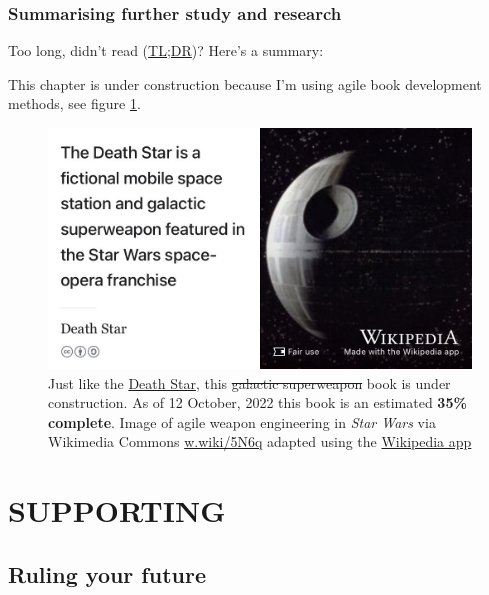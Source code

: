 \documentclass[
]{book}
\begin{document}
\hypertarget{tldr12}{%
\section{Summarising further study and research}\label{tldr12}}

Too long, didn't read (\href{https://en.wiktionary.org/wiki/too_long;_didn\%27t_read}{TL;DR})? Here's a summary:

This chapter is under construction because I'm using agile book development methods, see figure \ref{fig:deathstar9-fig}.

\begin{figure}

{\centering \includegraphics[width=0.99\linewidth]{images/DeathStar2} 

}

\caption{Just like the \href{https://en.wikipedia.org/wiki/Death_Star}{Death Star}, this \sout{galactic superweapon} book is under construction. As of 12 October, 2022 this book is an estimated \textbf{35\% complete}. Image of agile weapon engineering in \emph{Star Wars} via Wikimedia Commons \href{https://w.wiki/5N6q}{w.wiki/5N6q} adapted using the \href{https://apps.apple.com/gb/app/wikipedia/id324715238}{Wikipedia app}}\label{fig:deathstar9-fig}
\end{figure}

\hypertarget{part-supporting}{%
\part{SUPPORTING}\label{part-supporting}}

\hypertarget{ruling}{%
\chapter{Ruling your future}\label{ruling}}
\end{document}
